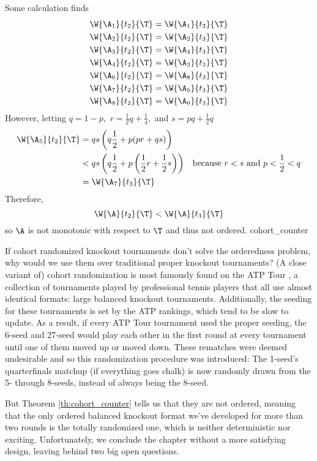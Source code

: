 {{        Some calculation finds
        \begin{align*}
            \W{\A_1}{t_2}{\T} &= \W{\A_1}{t_3}{\T}\\
            \W{\A_2}{t_2}{\T} &= \W{\A_2}{t_3}{\T}\\
            \W{\A_3}{t_2}{\T} &= \W{\A_4}{t_3}{\T}\\
            \W{\A_4}{t_2}{\T} &= \W{\A_3}{t_3}{\T}\\
            \W{\A_6}{t_2}{\T} &= \W{\A_8}{t_3}{\T}\\
            \W{\A_7}{t_2}{\T} &= \W{\A_5}{t_3}{\T}\\
            \W{\A_8}{t_2}{\T} &= \W{\A_6}{t_3}{\T}
        \end{align*}
        However, letting $q = 1- p,$ $r = \frac{1}{2}q + \frac{1}{4},$ and $s = pq + \frac{1}{2}q$
        \begin{align*}
            \W{\A_5}{t_2}{\T} &= qs\left(q\frac{1}{2}+p(pr + qs)\right)\\
            &<qs\left(q\frac{1}{2}+p\left(\frac{1}{2}r + \frac{1}{2}s\right)\right) &\textrm{because $r < s$ and $p < \frac{1}{2} < q$}\\
            &=\W{\A_7}{t_3}{\T} 
        \end{align*}
        Therefore, $$\W{\A}{t_2}{\T} < \W{\A}{t_3}{\T}$$ so $\A$ is not monotonic with respect to $\T$ and thus not ordered.
    }{cohort_counter}

    If cohort randomized knockout tournaments don't solve the orderedness problem, why would we use them over traditional proper knockout tournaments? (A close variant of) cohort randomization is most famously found on the ATP Tour \cite{wiki_atp}, a collection of tournaments played by professional tennis players that all use almost identical formats: large balanced knockout tournaments. Additionally, the seeding for these tournaments is set by the ATP rankings, which tend to be slow to update. As a result, if every ATP Tour tournament used the proper seeding, the 6-seed and 27-seed would play each other in the first round at every tournament until one of them moved up or moved down. These rematches were deemed undesirable and so this randomization procedure was introduced: The 1-seed's quarterfinals matchup (if everything goes chalk) is now randomly drawn from the 5- through 8-seeds, instead of always being the 8-seed.

    But Theorem \ref{th:cohort_counter} tells us that they are not ordered, meaning that the only ordered balanced knockout format we've developed for more than two rounds is the totally randomized one, which is neither deterministic nor exciting. Unfortunately, we conclude the chapter without a more satisfying design, leaving behind two big open questions.
    
}
